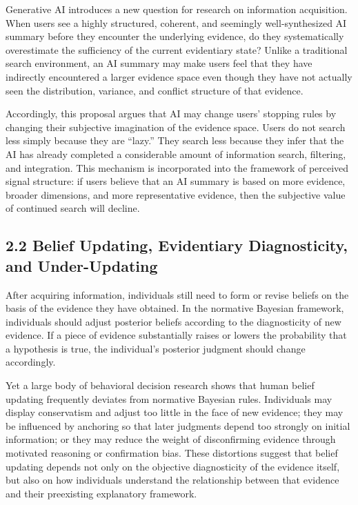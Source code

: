 Generative AI introduces a new question for research on information acquisition. When users see a highly structured, coherent, and seemingly well-synthesized AI summary before they encounter the underlying evidence, do they systematically overestimate the sufficiency of the current evidentiary state? Unlike a traditional search environment, an AI summary may make users feel that they have indirectly encountered a larger evidence space even though they have not actually seen the distribution, variance, and conflict structure of that evidence.

Accordingly, this proposal argues that AI may change users' stopping rules by changing their subjective imagination of the evidence space. Users do not search less simply because they are ``lazy.'' They search less because they infer that the AI has already completed a considerable amount of information search, filtering, and integration. This mechanism is incorporated into the framework of perceived signal structure: if users believe that an AI summary is based on more evidence, broader dimensions, and more representative evidence, then the subjective value of continued search will decline.

\subsection*{2.2 Belief Updating, Evidentiary Diagnosticity, and Under-Updating}

After acquiring information, individuals still need to form or revise beliefs on the basis of the evidence they have obtained. In the normative Bayesian framework, individuals should adjust posterior beliefs according to the diagnosticity of new evidence. If a piece of evidence substantially raises or lowers the probability that a hypothesis is true, the individual's posterior judgment should change accordingly.

Yet a large body of behavioral decision research shows that human belief updating frequently deviates from normative Bayesian rules. Individuals may display conservatism and adjust too little in the face of new evidence; they may be influenced by anchoring so that later judgments depend too strongly on initial information; or they may reduce the weight of disconfirming evidence through motivated reasoning or confirmation bias. These distortions suggest that belief updating depends not only on the objective diagnosticity of the evidence itself, but also on how individuals understand the relationship between that evidence and their preexisting explanatory framework.

